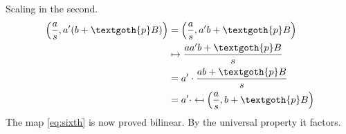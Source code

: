\documentclass{article}
\begin{document}
Scaling in the second.
\begin{align*}
\left( \frac{a}{s}, a'(b + \textgoth{p}B) \right)
& = \left( \frac{a}{s}, a'b + \textgoth{p}B \right) \\
& \mapsto \frac{aa'b + \textgoth{p}B}{s} \\
& = a' \cdot \frac{ab + \textgoth{p}B}{s} \\
& = a' \cdot \mapsfrom \left( \frac{a}{s}, b + \textgoth{p}B \right)
\end{align*}
The map \eqref{eq:sixth} is now proved bilinear. By the universal property it factors. 
\begin{figure}[htb]
\centering
\begin{subfigure}[T]{0.4\textwidth}
\centering
{}
\end{subfigure}
\centering
\begin{subfigure}[T]{0.4\textwidth}
\centering
{}
\end{subfigure}
\end{figure}
\end{document}
